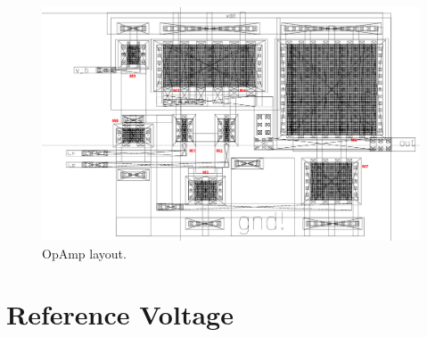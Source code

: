\documentclass[parskip,oneside,colorbacktitle,10pt,accentcolor=tud1b,table]{tudreport}
\begin{document}
{\begin{figure}[H]
	\begin{center}
		\includegraphics[width=\linewidth]{opanp_layout_fin}
	    \caption{OpAmp layout.}
	    \label{fig:opamp_layout}
	\end{center}
\end{figure}

\section{Reference Voltage}

}
\end{document}
